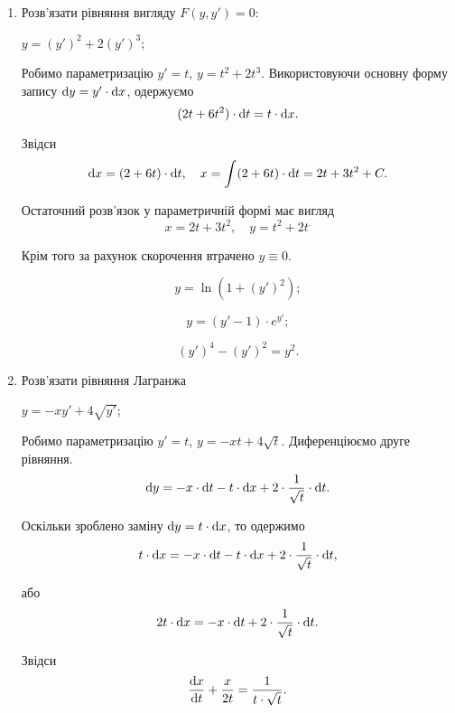 \begin{enumerate}
	\item Розв'язати рівняння вигляду $F(y, y') = 0$:
	\begin{example}
		$y = (y')^2 + 2 (y')^3$;
	\end{example}

	\begin{solution}
		Робимо параметризацію $y' = t$, $y = t^2 + 2t^3$. Використовуючи основну форму запису $\mathop{}\!\mathrm{d} y = y' \cdot \mathop{}\!\mathrm{d} x$, одержуємо
		\[ (2t + 6t^2) \cdot \mathop{}\!\mathrm{d} t = t \cdot \mathop{}\!\mathrm{d} x.\]

		Звідси \[ \mathop{}\!\mathrm{d} x = (2 + 6t) \cdot \mathop{}\!\mathrm{d} t, \quad x = \int(2+6t) \cdot \mathop{}\!\mathrm{d} t = 2t + 3t^2 + C.\]

		Остаточний розв'язок у параметричній формі має вигляд 
		\[ x = 2t + 3t^2, \quad y = t^2 + 2t^.\]

		Крім того за рахунок скорочення втрачено $y \equiv 0$.
	\end{solution}
	
	\begin{multicols}{2}
		\begin{problem}
			\[ y = \ln ( 1 + (y')^2); \]
		\end{problem}
		
		\begin{problem}
			\[ y = (y' - 1) \cdot e^{y'}; \]
		\end{problem}
		
		\begin{problem}
		 	\[ (y')^4 - (y')^2 = y^2. \]
		\end{problem}
	\end{multicols}

	\item Розв'язати рівняння Лагранжа
	\begin{example}
		$y = - x y' + 4 \sqrt{y'}$;
	\end{example}

	\begin{solution}
		Робимо параметризацію $y' = t$, $y = - xt + 4 \sqrt{t}$. Диференціюємо друге рівняння.
		\[ \mathop{}\!\mathrm{d} y = - x \cdot \mathop{}\!\mathrm{d} t - t \cdot \mathop{}\!\mathrm{d} x + 2 \cdot \frac{1}{\sqrt{t}} \cdot \mathop{}\!\mathrm{d} t.\]

		Оскільки зроблено заміну $\mathop{}\!\mathrm{d} y = t \cdot \mathop{}\!\mathrm{d} x$, то одержимо
		\[ t \cdot \mathop{}\!\mathrm{d} x = - x \cdot \mathop{}\!\mathrm{d} t - t \cdot \mathop{}\!\mathrm{d} x + 2 \cdot \frac{1}{\sqrt{t}} \cdot \mathop{}\!\mathrm{d} t,\]

		або
		\[ 2 t \cdot \mathop{}\!\mathrm{d} x = - x \cdot \mathop{}\!\mathrm{d} t + 2 \cdot \frac{1}{\sqrt{t}} \cdot \mathop{}\!\mathrm{d} t.\]

		Звідси
		\[ \frac{\mathop{}\!\mathrm{d} x}{\mathop{}\!\mathrm{d} t} + \frac{x}{2t} = \frac{1}{t \cdot \sqrt{t}}.\]


\end{solution}
\end{enumerate}
